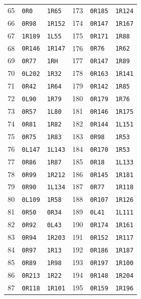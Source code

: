 \begin{longtable}{rll@{\hspace{2em}}rll}
65 & \texttt{0R0} & \texttt{1R65} & 173 & \texttt{0R185} & \texttt{1R124}\\
66 & \texttt{0R98} & \texttt{1R152} & 174 & \texttt{0R147} & \texttt{1R167}\\
67 & \texttt{1R189} & \texttt{1L55} & 175 & \texttt{0R171} & \texttt{1R88}\\
68 & \texttt{0R146} & \texttt{1R147} & 176 & \texttt{0R76} & \texttt{1R62}\\
69 & \texttt{0R77} & \texttt{1RH} & 177 & \texttt{0R147} & \texttt{1R89}\\
70 & \texttt{0L202} & \texttt{1R32} & 178 & \texttt{0R163} & \texttt{1R141}\\
71 & \texttt{0R42} & \texttt{1R64} & 179 & \texttt{0R142} & \texttt{1R85}\\
72 & \texttt{0L90} & \texttt{1R79} & 180 & \texttt{0R179} & \texttt{1R76}\\
73 & \texttt{0R57} & \texttt{1L80} & 181 & \texttt{0R146} & \texttt{1R175}\\
74 & \texttt{0R81} & \texttt{1R82} & 182 & \texttt{0R144} & \texttt{1L151}\\
75 & \texttt{0R75} & \texttt{1R83} & 183 & \texttt{0R98} & \texttt{1R53}\\
76 & \texttt{0L147} & \texttt{1L143} & 184 & \texttt{0R170} & \texttt{1R53}\\
77 & \texttt{0R86} & \texttt{1R87} & 185 & \texttt{0R18} & \texttt{1L133}\\
78 & \texttt{0R99} & \texttt{1R212} & 186 & \texttt{0R145} & \texttt{1R181}\\
79 & \texttt{0R90} & \texttt{1L134} & 187 & \texttt{0R77} & \texttt{1R118}\\
80 & \texttt{0L109} & \texttt{1R58} & 188 & \texttt{0R107} & \texttt{1R126}\\
81 & \texttt{0R50} & \texttt{0R34} & 189 & \texttt{0L41} & \texttt{1L111}\\
82 & \texttt{0R92} & \texttt{0L43} & 190 & \texttt{0R174} & \texttt{1R161}\\
83 & \texttt{0R94} & \texttt{1R203} & 191 & \texttt{0R152} & \texttt{1R117}\\
84 & \texttt{0R97} & \texttt{1R13} & 192 & \texttt{0R186} & \texttt{1R187}\\
85 & \texttt{0R89} & \texttt{1R98} & 193 & \texttt{0R197} & \texttt{1R100}\\
86 & \texttt{0R213} & \texttt{1R22} & 194 & \texttt{0R148} & \texttt{1R204}\\
87 & \texttt{0R118} & \texttt{1R101} & 195 & \texttt{0R159} & \texttt{1R196}\\

\end{longtable}
